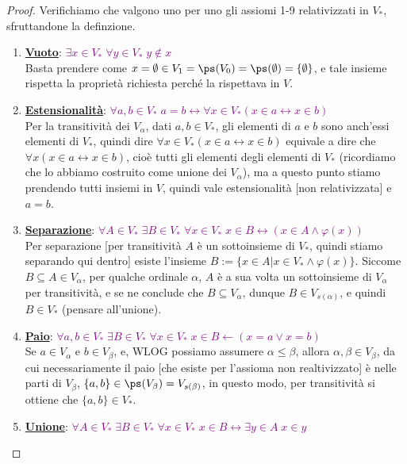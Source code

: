 \documentclass[11pt]{scrartcl}
\begin{document}
\begin{proof}
	Verifichiamo che valgono uno per uno gli assiomi 1-9 relativizzati in $V_*$, sfruttandone la definzione.
	\begin{enumerate}[(1)]
		\item \textbf{\underline{Vuoto}}: \textcolor{purple}{$\exists x \in V_* \; \forall y \in V_* \; y \not \in x$} \\
		Basta prendere come $x = \emptyset \in V_1 = \ps(V_0) = \ps(\emptyset) = \{\emptyset\}$, e tale insieme rispetta la proprietà richiesta perché la rispettava in $V$.
		\item \textbf{\underline{Estensionalità}}: \textcolor{purple}{$\forall a,b \in V_* \; a = b \leftrightarrow \forall x \in V_* (x \in a \leftrightarrow x \in b)$} \\
		Per la transitività dei $V_\alpha$, dati $a,b \in V_*$, gli elementi di $a$ e $b$ sono anch'essi elementi di $V_*$, quindi dire $\forall x \in V_* (x \in a \leftrightarrow x \in b)$ equivale a dire che $\forall x (x \in a \leftrightarrow x \in b)$, cioè
		tutti gli elementi degli elementi di $V_*$ (ricordiamo che lo abbiamo costruito come unione dei $V_\alpha$), ma a questo punto stiamo prendendo tutti insiemi in $V$, quindi vale estensionalità [non relativizzata] e $a = b$.
		\item \textbf{\underline{Separazione}}: \textcolor{purple}{$\forall A \in V_* \; \exists B \in V_* \; \forall x \in V_* \; x \in B \leftrightarrow (x \in A \land \varphi(x))$} \\
		Per separazione [per transitività $A$ è un sottoinsieme di $V_*$, quindi stiamo separando qui dentro] esiste l'insieme $B :=\{x \in A | x \in V_* \land \varphi(x)\}$. Siccome $B \subseteq A \in V_\alpha$, per qualche ordinale $\alpha$, $A$ è a sua volta un sottoinsieme di $V_\alpha$ per transitività, e se ne conclude che $B \subseteq V_\alpha$, dunque $B \in V_{s(\alpha)}$, e quindi $B \in V_*$ (pensare all'unione).
		\item \textbf{\underline{Paio}}: \textcolor{purple}{$\forall a,b \in V_* \; \exists B \in V_* \; \forall x \in V_* \; x \in B \leftarrow (x = a \lor x = b)$} \\
		Se $a \in V_\alpha$ e $b \in V_\beta$, e, WLOG possiamo assumere $\alpha \leq \beta$, allora $\alpha, \beta \in V_\beta$, da cui necessariamente il paio [che esiste per l'assioma non realtivizzato] è nelle parti di $V_\beta$, $\{a,b\} \in \ps(V_\beta) = V_{s(\beta)}$, in questo modo, per transitività si ottiene che $\{a,b\} \in V_*$.
		\item \textbf{\underline{Unione}}: \textcolor{purple}{$\forall A \in V_* \; \exists B \in V_* \; \forall x \in V_* \; x \in B \leftrightarrow \exists y \in A \; x \in y$} \\

\end{enumerate}
\end{proof}
\end{document}
